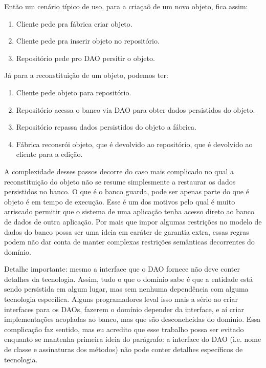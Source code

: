 \documentclass[a4paper, 12pt]{article}
\begin{document}
Então um cenário típico de uso, para a criaçaõ de um novo objeto, fica assim:
\begin{enumerate}
\item Cliente pede pra fábrica criar objeto.
\item Cliente pede pra inserir objeto no repositório.
\item Repositório pede pro DAO persitir o objeto.
\end{enumerate}

Já para a reconstituição de um objeto, podemos ter:

\begin{enumerate}
\item Cliente pede objeto para repositório.
\item Repositório acessa o banco via DAO para obter dados persistidos do objeto.
\item Repositório repassa dados persistidos do objeto a fábrica.
\item Fábrica reconsrói objeto, que é devolvido ao repositório, que é devolvido ao cliente para a edição.
\end{enumerate}

A complexidade desses passos decorre do caso mais complicado no qual a reconstituição do objeto não se resume simplesmente a restaurar os dados persistidos no banco. O que é o banco guarda, pode ser apenas parte do que é objeto é em tempo de execução. Esse é um dos motivos pelo qual é muito arriscado permitir que o sistema de uma aplicação tenha acesso direto ao banco de dados de outra aplicação. Por mais que impor algumas restrições no modelo de dados do banco possa ser uma ideia em caráter de garantia extra, essas regras podem não dar conta de manter complexas restrições semânticas decorrentes do domínio.

Detalhe importante: mesmo a interface que o DAO fornece não deve conter detalhes da tecnologia. Assim, tudo o que o domínio sabe é que a entidade está sendo persistida em algum lugar, mas sem nenhuma dependência com alguma tecnologia específica. Alguns programadores leval isso mais a sério ao criar interfaces para os DAOs, fazerem o domínio depender da interface, e aí criar implementações acopladas ao banco, mas que são desconehcidas do domínio. Essa complicação faz sentido, mas eu acredito que esse trabalho possa ser evitado enquanto se mantenha primeira ideia do parágrafo: a interface do DAO (i.e. nome de classe e assinaturas dos métodos) não pode conter detalhes específicos de tecnologia.
\end{document}
